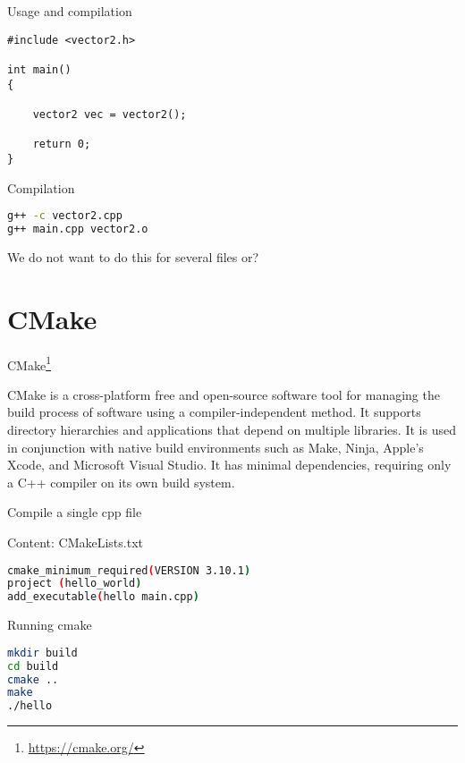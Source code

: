 \documentclass[12pt,t]{beamer}
\begin{document}
\begin{frame}[fragile]{Usage and compilation}
\begin{lstlisting}
#include <vector2.h>

int main()
{
   
    vector2 vec = vector2();

    return 0;
}
\end{lstlisting}

\begin{block}{Compilation}
\begin{lstlisting}[language=bash]
g++ -c vector2.cpp
g++ main.cpp vector2.o
\end{lstlisting}
\end{block}
\begin{center}
We do not want to do this for several files or?
\end{center}
\end{frame}

\section{CMake}

\begin{frame}{CMake\footnote{\tiny\url{https://cmake.org/}}}

CMake is a cross-platform free and open-source software tool for managing the build process of software using a compiler-independent method. It supports directory hierarchies and applications that depend on multiple libraries. It is used in conjunction with native build environments such as Make, Ninja, Apple's Xcode, and Microsoft Visual Studio. It has minimal dependencies, requiring only a C++ compiler on its own build system. 

\end{frame}

\begin{frame}[fragile]{Compile a single cpp file}
\begin{block}{Content: CMakeLists.txt}
\begin{lstlisting}[language=bash]
cmake_minimum_required(VERSION 3.10.1)
project (hello_world)
add_executable(hello main.cpp)
\end{lstlisting}
\end{block}

\begin{block}{Running cmake}
\begin{lstlisting}[language=bash]
mkdir build 
cd build
cmake ..
make
./hello
\end{lstlisting}
\end{block}
\end{frame}
\end{document}
